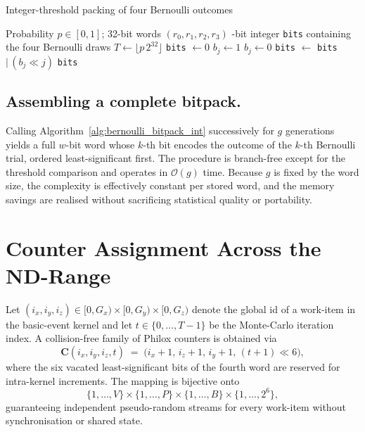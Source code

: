 \begin{algorithm}[H]
  \caption{Integer-threshold packing of four Bernoulli outcomes}
  \label{alg:bernoulli_bitpack_int}
  \begin{algorithmic}[1]
    \Require Probability $p\in[0,1]$; 32-bit words $(r_0,r_1,r_2,r_3)$
    -bit integer \texttt{bits} containing the four Bernoulli draws
    \State $T \gets \lfloor p\,2^{32}\rfloor$ 
    \State \texttt{bits} $\gets 0$
        \State $b_j \gets 1$
      \Else
        \State $b_j \gets 0$
      \EndIf
      \State \texttt{bits} $\gets$ \texttt{bits} $\mid\, (b_j \ll j)$
    \EndFor
    \State \Return \texttt{bits}
  \end{algorithmic}
\end{algorithm}

\subsection{Assembling a complete bitpack.}  Calling Algorithm~\ref{alg:bernoulli_bitpack_int} successively for $g$ generations yields a full \(w\)-bit word whose $k$-th bit encodes the outcome of the $k$-th Bernoulli trial, ordered least-significant first.  The procedure is branch-free except for the threshold comparison and operates in $\mathcal{O}(g)$ time.  Because $g$ is fixed by the word size, the complexity is effectively constant per stored word, and the memory savings are realised without sacrificing statistical quality or portability.

\section{Counter Assignment Across the ND-Range}
\label{subsec:counter_assignment}

Let $(i_x,i_y,i_z)\in[0,G_x)\times[0,G_y)\times[0,G_z)$ denote the global id of a work-item in the basic-event kernel and let $t\in\{0,\dots,T-1\}$ be the Monte-Carlo iteration index.  A collision-free family of Philox counters is obtained via
\[
   \mathbf{C}(i_x,i_y,i_z,t)
   \;=\;
   \bigl(i_{x}+1,\, i_{z}+1,\, i_{y}+1,\, (t+1)\ll 6\bigr),
\]
where the six vacated least-significant bits of the fourth word are reserved for intra-kernel increments.  The mapping is bijective onto
\[
   \{1,\dots,V\}\times\{1,\dots,P\}\times\{1,\dots,B\}\times\{1,\dots,2^{6}\},
\]
guaranteeing independent pseudo-random streams for every work-item without synchronisation or shared state.